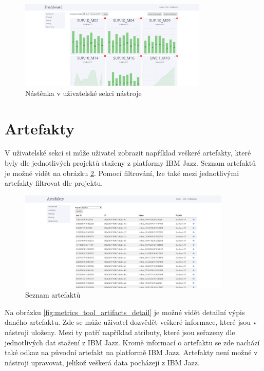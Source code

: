 \documentclass[czech,master]{diploma}
\begin{document}
\begin{figure}[!ht]
    \centering
    \includegraphics[width=0.8\textwidth]{Diplomka/Figures/metrics_tool/dashboard.jpg}
    \caption{Nástěnka v uživatelské sekci nástroje}
    \label{fig:metrics_tool_dashboard}
\end{figure}
\section{Artefakty}
V uživatelské sekci si může uživatel zobrazit například veškeré artefakty, které byly dle jednotlivých projektů staženy z platformy IBM Jazz. Seznam artefaktů je možné vidět na obrázku \ref{fig:metrics_tool_artifacts}. Pomocí filtrování, lze také mezi jednotlivými artefakty filtrovat dle projektu.

\begin{figure}[!ht]
    \centering
    \includegraphics[width=0.9\textwidth]{Diplomka/Figures/metrics_tool/artifacts.jpg}
    \caption{Seznam artefaktů}
    \label{fig:metrics_tool_artifacts}
\end{figure}

Na obrázku \ref{fig:metrics_tool_artifacts_detail} je možné vidět detailní výpis daného artefaktu. Zde se může uživatel dozvědět veškeré informace, které jsou v nástroji uloženy. Mezi ty patří například atributy, které jsou seřazeny dle jednotlivých dat stažení z IBM Jazz. Kromě informací o artefaktu se zde nachází také odkaz na původní artefakt na platformě IBM Jazz. Artefakty není možné v nástroji upravovat, jelikož veškerá data pocházejí z IBM Jazz.
\end{document}
